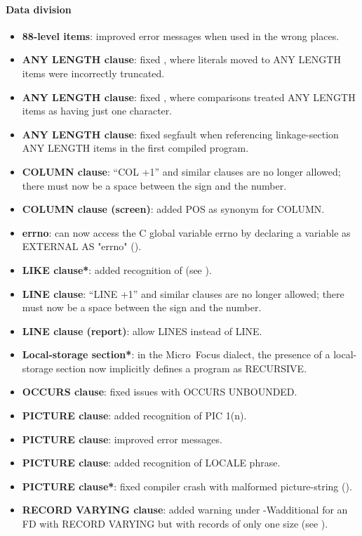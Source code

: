 \paragraph{Data division}
\begin{itemize}
\item \textbf{88-level items}: improved error messages when used in the wrong places.
\item \textbf{ANY LENGTH clause}: fixed , where literals moved to ANY LENGTH items were incorrectly truncated.
\item \textbf{ANY LENGTH clause}: fixed , where comparisons treated ANY LENGTH items as having just one character.
\item \textbf{ANY LENGTH clause}: fixed segfault when referencing linkage-section ANY LENGTH items in the first compiled program.
\item \textbf{COLUMN clause}: ``COL +1'' and similar clauses are no longer allowed; there must now be a space between the sign and the number.
\item \textbf{COLUMN clause (screen)}: added POS as synonym for COLUMN.
\item \textbf{errno}: can now access the C global variable errno by declaring a variable as EXTERNAL AS "errno" ().
\item \textbf{LIKE clause*}: added recognition of (see ).
\item \textbf{LINE clause}: ``LINE +1'' and similar clauses are no longer allowed; there must now be a space between the sign and the number.
\item \textbf{LINE clause (report)}: allow LINES instead of LINE.
\item \textbf{Local-storage section*}: in the Micro~Focus dialect, the presence of a local-storage section now implicitly defines a program as RECURSIVE.
\item \textbf{OCCURS clause}: fixed issues with OCCURS UNBOUNDED.
\item \textbf{PICTURE clause}: added recognition of PIC 1(n).
\item \textbf{PICTURE clause}: improved error messages.
\item \textbf{PICTURE clause}: added recognition of LOCALE phrase.
\item \textbf{PICTURE clause*}: fixed compiler crash with malformed picture-string ().
\item \textbf{RECORD VARYING clause}: added warning under -Wadditional for an FD with RECORD VARYING but with records of only one size (see ).

\end{itemize}
